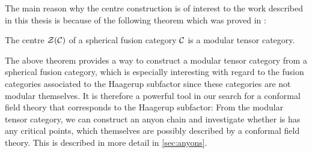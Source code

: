 The main reason why the centre construction is of interest to the work described in this thesis is because of the following theorem which was proved in \cite{muger_subfactors_2003-1}:
	\begin{thm}
		The centre $\mathcal{Z}({\mathcal{C}})$ of a spherical fusion category ${\mathcal{C}}$ is a modular tensor category.
	\end{thm}

The above theorem provides a way to construct a modular tensor category from a spherical fusion category, which is especially interesting with regard to the fusion categories associated to the Haagerup subfactor since these categories are not modular themselves. It is therefore a powerful tool in our search for a conformal field theory that corresponds to the Haagerup subfactor: From the modular tensor category, we can construct an anyon chain and investigate whether is has any critical points, which themselves are possibly described by a conformal field theory. This is described in more detail in \cref{sec:anyons}.